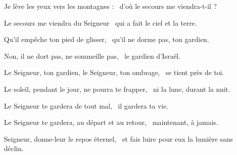 \item Je lève les yeux vers les montagnes :~\psstar{} d'où le secours me viendra-t-il ?

\item Le secours me viendra du Seigneur~\psstar{} qui a fait le ciel et la terre.

\item Qu'il empêche ton pied de glisser,~\psstar{} qu'il ne dorme pas, ton gardien.

\item Non, il ne dort pas, ne sommeille pas,~\psstar{} le gardien d'Israël.

\item Le Seigneur, ton gardien, le Seigneur, ton ombrage,~\psstar{} se tient près de toi.

\item Le soleil, pendant le jour, ne pourra te frapper,~\psstar{} ni la lune, durant la nuit.

\item Le Seigneur te gardera de tout mal,~\psstar{} il gardera ta vie.

\item Le Seigneur te gardera, au départ et au retour,~\psstar{} maintenant, à jamais.

\item Seigneur, donne-leur le repos éternel,~\psstar{} et fais luire pour eux la lumière sans déclin.